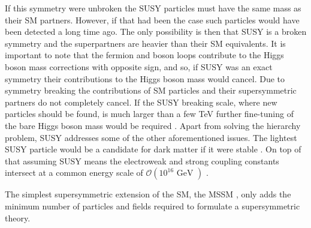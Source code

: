 If this symmetry were unbroken the \ac{SUSY} particles must
have the same mass as their \ac{SM} partners. However, if that had 
been the case such particles would have been detected a long time ago. The 
only possibility is then that \ac{SUSY} is a broken symmetry and the superpartners
are heavier than their \ac{SM} equivalents. It is important to note
that the fermion and boson loops contribute to the Higgs boson
mass corrections with opposite sign, and so, if \ac{SUSY}
was an exact symmetry their contributions to the Higgs boson mass
would cancel. Due to 
symmetry breaking the contributions of \ac{SM} particles 
and their supersymmetric partners do not completely cancel. If
the \ac{SUSY} breaking scale, where new particles should
be found, is much larger than a few TeV further fine-tuning of 
the bare Higgs boson mass would be required \cite{MSSM-carena-haber,SUSY-primer}.
Apart from solving the hierarchy problem, \ac{SUSY} addresses some
of the other aforementioned issues. The lightest \ac{SUSY} particle
would be a candidate for dark matter if it were stable \cite{SUSY-primer}. On top of that
assuming \ac{SUSY} means the electroweak and strong coupling
constants intersect at a common energy scale of $\mathcal{O}(10^{16} \text{ GeV })$ \cite{GUT-LEP}. 

The simplest supersymmetric extension of the \ac{SM}, the \ac{MSSM} \cite{SUSY-primer}, only adds the minimum
number of particles and fields required to formulate a supersymmetric theory.


